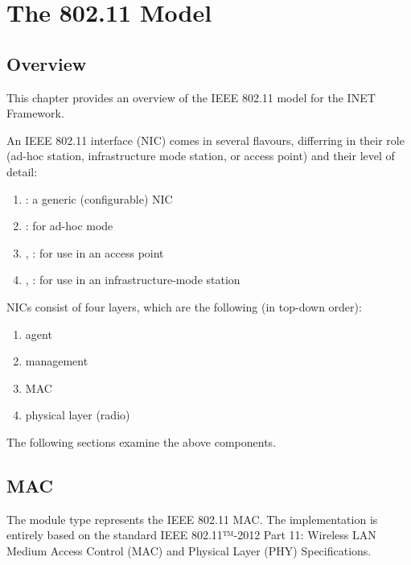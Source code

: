 \chapter{The 802.11 Model}
\label{cha:80211}


\section{Overview}
\label{sec:80211:overview}

This chapter provides an overview of the IEEE 802.11 model for the INET Framework.

An IEEE 802.11 interface (NIC) comes in several flavours, differring
in their role (ad-hoc station, infrastructure mode station, or
access point) and their level of detail:

\begin{enumerate}
 \item {}: a generic (configurable) NIC
 \item {}: for ad-hoc mode
 \item {}, : for use in an access point
 \item {}, : for use in an
   infrastructure-mode station
\end{enumerate}

NICs consist of four layers, which are the following (in top-down order):

\begin{enumerate}
  \item agent
  \item management
  \item MAC
  \item physical layer (radio)
\end{enumerate}

The following sections examine the above components.

\section{MAC}
\label{sec:80211:mac}

The  module type represents the IEEE 802.11 MAC.
The implementation is entirely based on the standard IEEE 802.11™-2012 Part 11:
Wireless LAN Medium Access Control (MAC) and Physical Layer (PHY)
Specifications.

